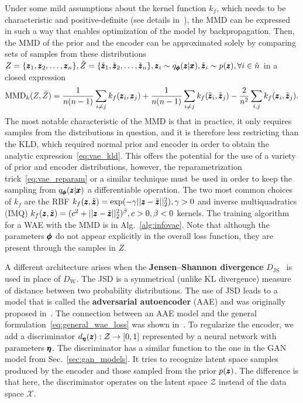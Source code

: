 Under some mild assumptions about the kernel function $k_f$, which needs to be characteristic and positive-definite (see details in~\cite{tolstikhin2017wasserstein}), the MMD can be expressed in such a way that enables optimization of the model by backpropagation. Then, the MMD of the prior and the encoder can be approximated solely by comparing sets of samples from these distributions $Z=\{\pmb{{z}}_{1}, \pmb{{z}}_{2}, \ldots, \pmb{{z}}_{n}\}, \tilde{Z}=\{\tilde{\pmb{{z}}}_{1}, \tilde{\pmb{{z}}}_{2}, \ldots, \tilde{\pmb{{z}}}_{n}\},\pmb{{z}}_{i}\sim q_{\pmb{{\phi}}}(\pmb{{z}}|\pmb{{x}}),\tilde{\pmb{{z}}}_{i} \sim p(\pmb{{z}}),\forall i \in \hat{n}$ in a closed expression
\begin{equation} \label{eq:mmd}
\text{MMD}_{k}(Z,\tilde{Z})=\frac{1}{n(n-1)}\sum_{i\neq j}k_f(\pmb{{z}}_{i},\pmb{{z}}_{j})+\frac{1}{n(n-1)}\sum_{i\neq j}k_f(\tilde{\pmb{{z}}}_{i},\tilde{\pmb{{z}}}_{j})-\frac{2}{n^{2}}\sum_{i,j}k_f(\pmb{{z}}_{i}, \tilde{\pmb{{z}}}_{j}).
\end{equation}
The most notable characteristic of the MMD is that in practice, it only requires samples from the distributions in question, and it is therefore less restricting than the KLD, which required normal prior and encoder in order to obtain the analytic expression~\eqref{eq:vae_kld}. This offers the potential for the use of a variety of prior and encoder distributions, however, the reparametrization trick~\eqref{eq:vae_reparam} or a similar technique must be used in order to keep the sampling from $q_{\pmb{{\phi}}}(\pmb{{z}}|\pmb{{x}})$ a differentiable operation. The two most common choices of $k_f$ are the RBF $k_f(\pmb{{z}},\tilde{\pmb{{z}}}) = \exp(- \gamma \vert \vert \pmb{{z}} - \tilde{\pmb{{z}}} \vert \vert_2^2), \gamma > 0$ and inverse multiquadratics (IMQ) $k_f(\pmb{{z}},\tilde{\pmb{{z}}}) = (c^2 +  \vert \vert \pmb{{z}} - \tilde{\pmb{{z}}} \vert \vert_2^2)^\beta, c>0, \beta < 0$ kernels. The training algorithm for a WAE with the MMD is in Alg.~\ref{alg:infovae}. Note that although the parameters $\pmb{{\phi}}$ do not appear  explicitly in the overall loss function, they are present through the samples in $Z$. 

A different architecture arises when the \textbf{Jensen--Shannon divergence} $D_{\text{JS}}$~\cite{barranco1994texture} is used in place of $D_{\text{W}}$. The JSD is a symmetrical (unlike KL divergence) measure of distance between two probability distributions. The use of JSD leads to a model that is called  the \textbf{adversarial autoencoder} (AAE) and was originally proposed in~\cite{makhzani2015adversarial}. The connection between an AAE model and the general formulation~\eqref{eq:general_wae_loss} was shown in~\cite{tolstikhin2017wasserstein}. To regularize the encoder, we add a discriminator $d_{\vc{\eta}}(\vc{z}):\mathcal{Z}\rightarrow\left[0,1\right]$ represented by a neural network with parameters $\pmb{{\eta}}$. The discriminator has a similar function to the one in the GAN model from Sec.~\ref{sec:gan_models}. It tries to recognize latent space samples produced by the encoder and those sampled from the prior $p(\pmb{{z}})$. The difference is that here, the discriminator operates on the latent space $\mathcal{Z}$ instead of the data space $\mathcal{X}$. 

